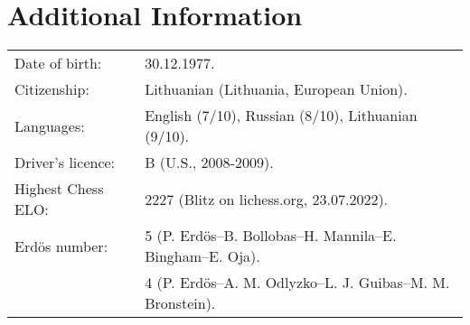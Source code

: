 \documentclass[a4paper,11pt]{article}
\begin{document}
\section{Additional Information}
%
\begin{tabular}{ll}
		Date of birth: & 30.12.1977.\\
		Citizenship: & Lithuanian (Lithuania, European Union).\\
        Languages: & English (7/10), Russian (8/10), Lithuanian (9/10).\\
        Driver's licence:& B (U.S., 2008-2009).\\
        Highest Chess ELO:& 2227 (Blitz on lichess.org, 23.07.2022).\\
        Erd\"{o}s number: & 5 (P. Erd\"{o}s--B. Bollobas--H. Mannila--E. Bingham--E. Oja).\\
                          & 4 (P. Erd\"{o}s--A. M. Odlyzko--L. J. Guibas--M. M. Bronstein).
\end{tabular}
%

\end{document}

